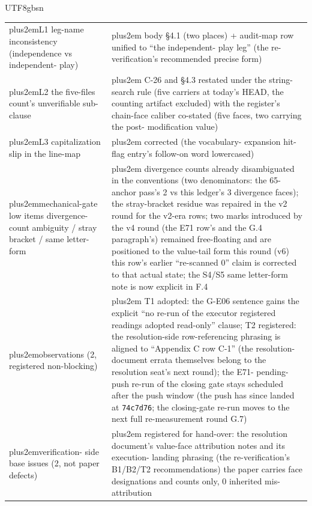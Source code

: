 \documentclass[11pt,letterpaper]{article}
\newcommand{\RaggedRight}{\rightskip=0pt plus2em\relax}
\begin{document}
\begin{CJK}{UTF8}{gbsn}
{\begin{longtable}{>{\RaggedRight\arraybackslash}p{6.85cm} >{\RaggedRight\arraybackslash}p{6.85cm}}
L1 \textemdash{} leg-name inconsistency (independence vs independent-\penalty-100 play) & body \S{}4.1 (two places) + audit-map row unified to ``the independent-\penalty-100 play leg'' (the re-verification's recommended precise form) \\
L2 \textemdash{} the five-files count's unverifiable sub-clause & C-26 and \S{}4.3 restated under the string-search rule (five carriers at today's HEAD, the counting artifact excluded) with the register's chain-face caliber co-stated (five faces, two carrying the post-\penalty-100 modification value) \\
L3 \textemdash{} capitalization slip in the line-map & corrected (the vocabulary-\penalty-100 expansion hit-flag entry's follow-on word lowercased) \\
mechanical-gate low items \textemdash{} divergence-\penalty-100 count ambiguity / stray bracket / same letter-form & divergence counts already disambiguated in the conventions (two denominators: the 65-anchor pass's 2 vs this ledger's 3 divergence faces); the stray-bracket residue was repaired in the v2 round for the v2-era rows; two marks introduced by the v4 round (the E71 row's and the G.4 paragraph's) remained free-floating and are positioned to the value-tail form this round (v6) \textemdash{} this row's earlier ``re-scanned 0'' claim is corrected to that actual state; the S4/S5 same letter-form note is now explicit in F.4 \\
observations (2, registered non-blocking) & T1 adopted: the G-E06 sentence gains the explicit ``no re-run of the executor \textemdash{} registered readings adopted read-only'' clause; T2 registered: the resolution-side row-referencing phrasing is aligned to ``Appendix C row C-1'' (the resolution-\penalty-100 document errata themselves belong to the resolution seat's next round); the E71-\penalty-100 pending-\penalty-100 push re-run of the closing gate stays scheduled after the push window (the push has since landed at \texttt{74c7d76}; the closing-gate re-run moves to the next full re-measurement round \textemdash{} G.7) \\
verification-\penalty-100 side base issues (2, not paper defects) & registered for hand-over: the resolution document's value-face attribution notes and its execution-\penalty-100 landing phrasing (the re-verification's B1/B2/T2 recommendations) \textemdash{} the paper carries face designations and counts only, 0 inherited mis-attribution \\
\end{longtable}}


\end{CJK}
\end{document}
